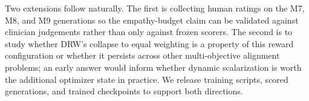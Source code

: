 \documentclass[10pt,twocolumn]{article}
\begin{document}
Two extensions follow naturally. The first is collecting human ratings on the M7, M8, and M9 generations so the empathy-budget claim can be validated against clinician judgements rather than only against frozen scorers. The second is to study whether DRW's collapse to equal weighting is a property of this reward configuration or whether it persists across other multi-objective alignment problems; an early answer would inform whether dynamic scalarization is worth the additional optimizer state in practice. We release training scripts, scored generations, and trained checkpoints to support both directions.

\balance
\FloatBarrier


\end{document}
